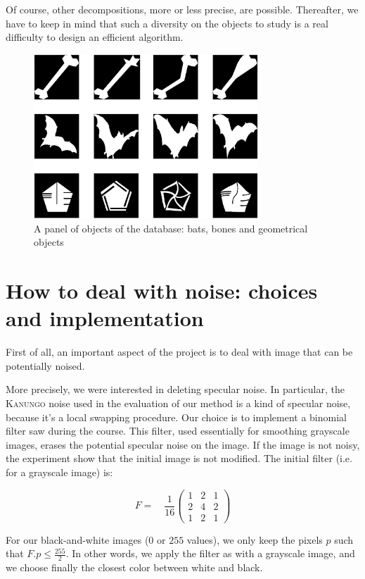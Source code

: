 Of course, other decompositions, more or less precise, are possible. Thereafter, we have to keep in mind that such a diversity on the objects to study is a real difficulty to design an efficient algorithm.

\begin{figure}[!ht]
    \centering
    \includegraphics[height=175pt]{images/shapedata.eps}
	\caption{A panel of objects of the database: bats, bones and geometrical objects}
	\label{shapedata}
\end{figure}


\section{How to deal with noise: choices and implementation}

\label{filter}

First of all, an important aspect of the project is to deal with image that can be potentially noised.

More precisely, we were interested in deleting specular noise. In particular, the \textsc{Kanungo} noise used in the evaluation of our method is a kind of specular noise, because it's a local swapping procedure. Our choice is to implement a binomial filter saw during the course. This filter, used essentially for smoothing grayscale images, erases the potential specular noise on the image. If the image is not noisy, the experiment show that the initial image is not modified. The initial filter (i.e. for a grayscale image) is:

\setcounter{MaxMatrixCols}{3}
\[ F = \quad \frac{1}{16} \begin{pmatrix}
1 & 2 & 1 \\
2 & 4 & 2 \\
1 & 2 & 1
\end{pmatrix}\]

For our black-and-white images ($0$ or $255$ values), we only keep the pixels $p$ such that $F.p \leq \frac{255}{2}$. In other words, we apply the filter as with a grayscale image, and we choose finally the closest color between white and black.

